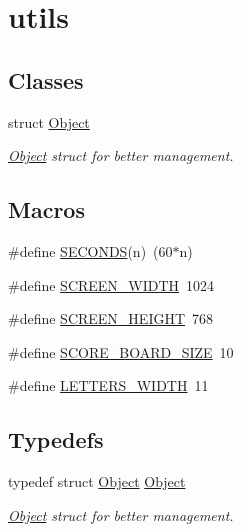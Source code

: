 \hypertarget{group__utils}{}\section{utils}
\label{group__utils}
\subsection*{Classes}
\begin{DoxyCompactItemize}
\item 
struct \hyperlink{structObject}{Object}
\begin{DoxyCompactList}\small\item\em \hyperlink{structObject}{Object} struct for better management. \end{DoxyCompactList}\end{DoxyCompactItemize}
\subsection*{Macros}
\begin{DoxyCompactItemize}
\item 
\#define \hyperlink{group__utils_gadf2c712678d6d4f09563efeeba1c09c1}{S\+E\+C\+O\+N\+DS}(n)~(60$\ast$n)
\item 
\#define \hyperlink{group__utils_ga2cd109632a6dcccaa80b43561b1ab700}{S\+C\+R\+E\+E\+N\+\_\+\+W\+I\+D\+TH}~1024
\item 
\#define \hyperlink{group__utils_ga6974d08a74da681b3957b2fead2608b8}{S\+C\+R\+E\+E\+N\+\_\+\+H\+E\+I\+G\+HT}~768
\item 
\#define \hyperlink{group__utils_ga85e9c9dc96b1373ebdb408da38eb5367}{S\+C\+O\+R\+E\+\_\+\+B\+O\+A\+R\+D\+\_\+\+S\+I\+ZE}~10
\item 
\#define \hyperlink{group__utils_gafe7e7ed956ca5dbee657f5fa7e1f4e9a}{L\+E\+T\+T\+E\+R\+S\+\_\+\+W\+I\+D\+TH}~11
\end{DoxyCompactItemize}
\subsection*{Typedefs}
\begin{DoxyCompactItemize}
\item 
typedef struct \hyperlink{structObject}{Object} \hyperlink{group__utils_gab1287b6141419421dc5c14b9f7756b0a}{Object}
\begin{DoxyCompactList}\small\item\em \hyperlink{structObject}{Object} struct for better management. \end{DoxyCompactList}\end{DoxyCompactItemize}

